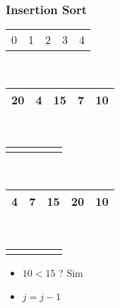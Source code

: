 \documentclass{beamer}
\begin{document}
\begin{frame}
    \frametitle{Insertion Sort}
    \begin{center}
        \begin{table}
            \begin{tabular}{p{0.25cm} p{0.25cm} p{0.25cm} p{0.25cm} p{0.25cm}}
                0 & 1 & 2 & 3 & 4
            \end{tabular} \\
            \begin{tabular}{| p{0.25cm} | p{0.25cm} | p{0.25cm} | p{0.25cm} | p{0.25cm} |}
                \hline
                20 & 4 & 15 & 7 & 10 \\ \hline
            \end{tabular} \\
            \begin{tabular}{p{0.25cm} p{0.25cm} p{0.25cm} p{0.25cm} p{0.25cm}}
                & & & & \color{blue}{$\updownarrow$}
            \end{tabular} \\
            \begin{tabular}{| p{0.25cm} | p{0.25cm} | p{0.25cm} | p{0.25cm} | p{0.25cm} |}
                \hline
                4 & 7 & 15 & 20 & 10 \\ \hline
            \end{tabular} \\
            \begin{tabular}{p{0.25cm} p{0.25cm} p{0.25cm} p{0.25cm} p{0.25cm}}
                & & \color{red}{$\uparrow$} & & \color{blue}{$\uparrow$}
            \end{tabular}
        \end{table}
	\end{center}
    \begin{itemize}[<+->]
        \item $10 < 15$ ? Sim
        \item $j = j - 1$
    \end{itemize}
\end{frame}
\end{document}
